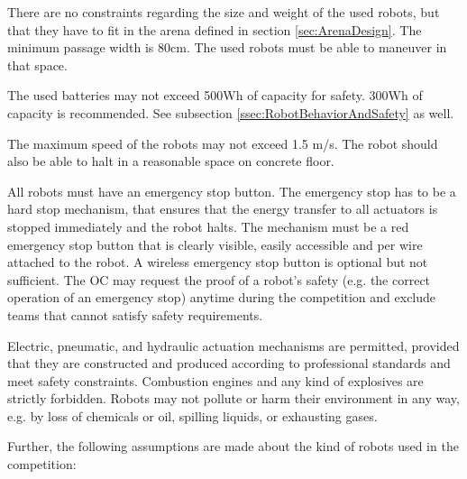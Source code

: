 There are no constraints regarding the size and weight of the used robots, but that they have to fit in the arena defined in section \ref{sec:ArenaDesign}. The minimum passage width is $80\si{\centi\meter}$. The used robots must be able to maneuver in that space.\par

The used batteries may not exceed 500Wh of capacity for safety. 300Wh of capacity is recommended. See subsection \ref{ssec:RobotBehaviorAndSafety} as well.\par 

The maximum speed of the robots may not exceed 1.5 m/s. The robot should also be able to halt in a reasonable space on concrete floor.\par 
\par
All robots must have an emergency stop button. The emergency stop has to be a hard stop mechanism, that ensures that the energy transfer to all actuators is stopped immediately and the robot halts. The mechanism must be a red emergency stop button that is clearly visible, easily accessible and per wire attached to the robot. A wireless emergency stop button is optional but not sufficient.
The OC may request the proof of a robot's safety (e.g. the correct operation of an emergency stop) anytime during the competition and exclude teams that cannot satisfy safety requirements.
\par
Electric, pneumatic, and hydraulic actuation mechanisms are permitted, provided that they are constructed and produced according to professional standards and meet safety constraints. Combustion engines and any kind of explosives are strictly forbidden. Robots may not pollute or harm their environment in any way, e.g. by loss of chemicals or oil, spilling liquids, or exhausting gases.
\par
Further, the following assumptions are made about the kind of robots used in the competition:
\par
